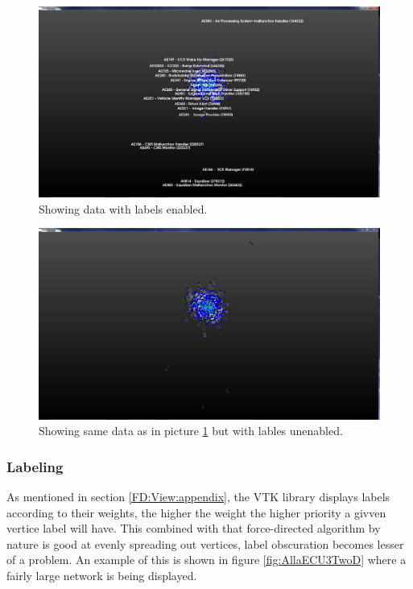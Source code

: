 \documentclass[a4paper,11pt]{kth-mag}
\begin{document}
\newpage
 \begin{figure}[!htbp]
	\centering
	\includegraphics[scale=0.3]{SesammVisualAppPics/2D-View/Labled/AE/2D-View1}
	\caption{Showing data with labels enabled.}
	\label{fig:AllaAesTwoDLabeled}
\end{figure}

\begin{figure}[!htbp]
	\centering
	\includegraphics[scale=0.3]{SesammVisualAppPics/2D-View/Unlabled/AE/AllaAE1}
	\caption{Showing same data as in picture \ref{fig:AllaAesTwoDLabeled} but with lables unenabled.}
	\label{fig:AllaAesTwoDUnLabeled}
\end{figure}

\subsubsection{Labeling}
As mentioned in section \ref{FD:View:appendix}, the VTK library displays labels according to their weights, the higher the weight the higher priority a givven vertice label will have. This combined with that force-directed algorithm by nature is good at evenly spreading out vertices, label 
obscuration becomes lesser of a problem. An example of this is shown in figure \ref{fig:AllaECU3TwoD} where a fairly large network is being displayed. 
\end{document}
